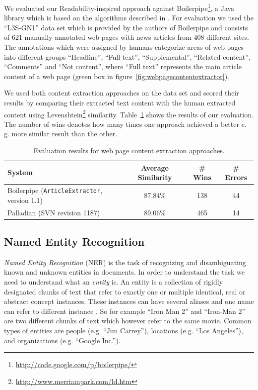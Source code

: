\documentclass[a4paper,twoside]{book}      %
\begin{document}

We evaluated our Readability-inspired approach against Boilerpipe\footnote{\url{http://code.google.com/p/boilerpipe/}}, a Java library which is based on the algorithms described in \cite{BoilerplateDetectionShallowTextFeatures}. For evaluation we used the ``L3S-GN1'' data set which is provided by the authors of Boilerpipe and consists of 621 manually annotated web pages with news articles from 408 different sites. The annotations which were assigned by humans categorize areas of web pages into different groups ``Headline'', ``Full text'',  ``Supplemental'', ``Related content'', ``Comments'' and  ``Not content'', where ``Full text'' represents the main article content of a web page (green box in figure~\ref{fig:webpagecontentextractor}).

We used both content extraction approaches on the data set and scored their results by comparing their extracted text content with the human extracted content using Levenshtein\footnote{\url{http://www.merriampark.com/ld.htm}} similarity. Table~\ref{tab:pageContentExtractionResults} shows the results of our evaluation. The number of wins denotes how many times one approach achieved a better e. g. more similar result than the other.


\begin{table}[ht]
\centering
\begin{tabular}{|l|c|c|c|}
	\hline
	System & Average Similarity & \# Wins & \# Errors \\ 
	\hline
	Boilerpipe (\texttt{ArticleExtractor}, version 1.1) & 87.84\% & 138 & 44 \\ 
	\hline
	Palladian (SVN revision 1187) & 89.06\% & 465 & 14 \\ 
	\hline
\end{tabular}
\caption{Evaluation results for web page content extraction approaches.}
\label{tab:pageContentExtractionResults}
\end{table}

\subsection{Named Entity Recognition}

{\it Named Entity Recognition} (NER) is the task of recognizing and disambiguating known and unknown entities in documents. In order to understand the task we need to understand what an {\it entity} is. An entity is a collection of rigidly designated chunks of text that refer to exactly one or multiple identical, real or abstract concept instances. These instances can have several aliases and one name can refer to different instance \cite{webknoxblogne}. So for example ``Iron Man 2'' and ``Iron-Man 2'' are two different chunks of text which however refer to the same movie. Common types of entities are people (e.g. ``Jim Carrey''), locations (e.g. ``Los Angeles''), and organizations (e.g. ``Google Inc.'').
\end{document}
